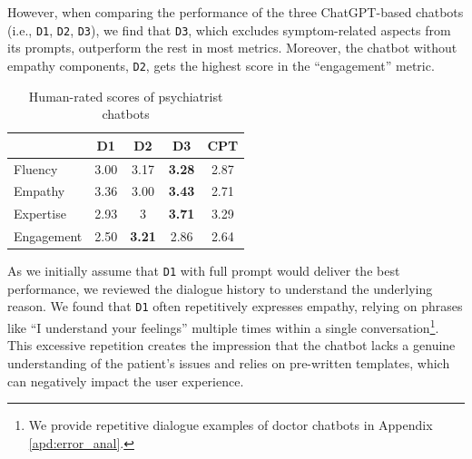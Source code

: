 However, when comparing the performance of the three ChatGPT-based chatbots (i.e., \texttt{D1}, \texttt{D2}, \texttt{D3}), we find that
\texttt{D3}, which excludes symptom-related aspects from its prompts, outperform the rest in most metrics. Moreover, the chatbot without empathy components, \texttt{D2}, gets the highest score in the ``engagement'' metric. 

\begin{table}[th]
    \small
    \centering
    \begin{tabular}{l|ccc|c}
    \hline
     & D1 & D2 & D3 & CPT \\ 
    \hline
    Fluency &3.00	&3.17	&\textbf{3.28}	&2.87 \\
    Empathy &3.36	&3.00	&\textbf{3.43}	&2.71 \\
    Expertise & 2.93	&3	&\textbf{3.71}	&3.29\\
    Engagement & 2.50	&\textbf{3.21}	&2.86	&2.64 \\
    \hline
    \end{tabular}
    \caption{Human-rated scores of psychiatrist chatbots}
    \label{tab:human_doc}
\end{table}

As we initially assume that \texttt{D1} with full prompt would deliver the best performance, we reviewed the dialogue history to understand the underlying reason. We found that \texttt{D1} often repetitively expresses empathy, relying on phrases like ``I understand your feelings'' multiple times within a single conversation\footnote{We provide repetitive dialogue examples of doctor chatbots in Appendix \ref{apd:error_anal}.}. This excessive repetition creates the impression that the chatbot lacks a genuine understanding of the patient's issues and relies on pre-written templates, which can negatively impact the user experience.

